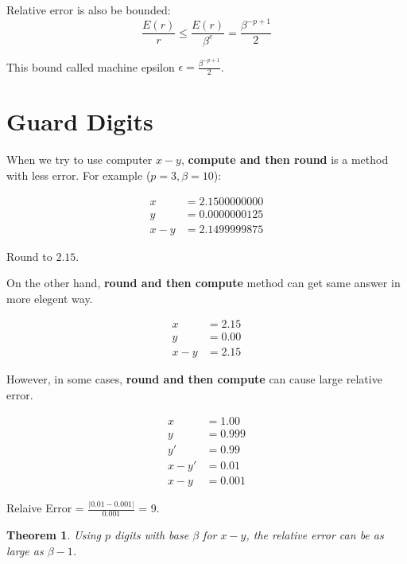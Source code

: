 \documentclass{article}
\newtheorem{theorem}{Theorem}
\begin{document}
        Relative error is also be bounded:
        \[
            \frac{E(r)}{r} \leq \frac{E(r)}{\beta^c} = \frac{\beta^{-p+1}}{2}
        \]
        
        This bound called machine epsilon $\epsilon = \frac{\beta^{-p+1}}{2}$.

        \section{Guard Digits}

        When we try to use computer $x - y$,
        \textbf{compute and then round} is a method with less error. For example ($p = 3, \beta = 10$):
        
        \begin{align}
            x     &= 2.1500000000 \\
            y     &= 0.0000000125 \\
            x - y &= 2.1499999875 
        \end{align}

        Round to $2.15$.

        On the other hand, \textbf{round and then compute}
        method can get same answer in more elegent way.

        \begin{align}
            x     &= 2.15 \\
            y     &= 0.00 \\
            x - y &= 2.15 
        \end{align}

        However, in some cases, \textbf{round and then compute}
        can cause large relative error.

        \begin{align}
            x      &= 1.00  \\
            y      &= 0.999 \\
            y'     &= 0.99  \\
            x - y' &= 0.01  \\
            x - y  &= 0.001
        \end{align}

        Relaive Error = $\frac{|0.01 - 0.001|}{0.001}$ = 9.

        \begin{theorem}
            Using $p$ digits with base $\beta$ for $x-y$, the relative error
            can be as large as $\beta - 1$.
        \end{theorem}
        
\end{document}
